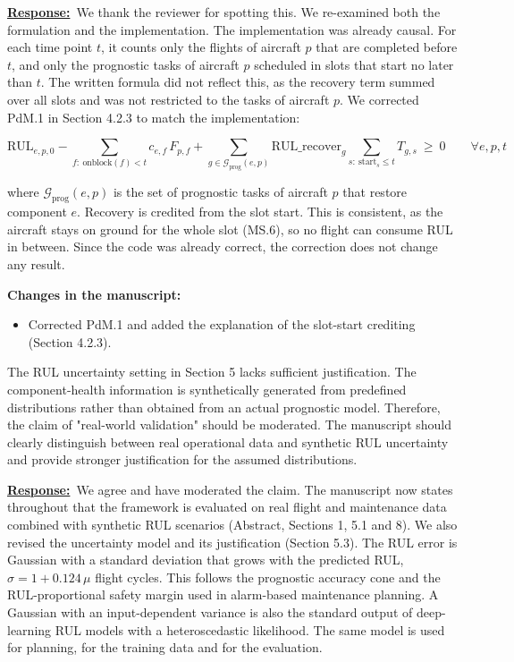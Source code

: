 \documentclass{article}
\newcommand{\response}{\vspace{0.1cm}\noindent\underline{\textbf{Response:}}\ }
\newcommand{\changes}{\vspace{0.1cm}\noindent\textbf{Changes in the manuscript:}}
\begin{document}
\response We thank the reviewer for spotting this. We re-examined both the formulation and the implementation. The implementation was already causal. For each time point $t$, it counts only the flights of aircraft $p$ that are completed before $t$, and only the prognostic tasks of aircraft $p$ scheduled in slots that start no later than $t$. The written formula did not reflect this, as the recovery term summed over all slots and was not restricted to the tasks of aircraft $p$. We corrected PdM.1 in Section 4.2.3 to match the implementation:

\[
\mathrm{RUL}_{e,p,0} - \sum_{f:\ \mathrm{onblock}(f) < t} c_{e,f}\, F_{p,f} + \sum_{g \in \mathcal{G}_{\text{prog}}(e,p)} \mathrm{RUL\_recover}_g \sum_{s:\ \mathrm{start}_s \le t} T_{g,s} \ \ge\ 0 \qquad \forall e,p,t
\]

where $\mathcal{G}_{\text{prog}}(e,p)$ is the set of prognostic tasks of aircraft $p$ that restore component $e$. Recovery is credited from the slot start. This is consistent, as the aircraft stays on ground for the whole slot (MS.6), so no flight can consume RUL in between. Since the code was already correct, the correction does not change any result.

\changes
\begin{itemize}[nosep]
\item Corrected PdM.1 and added the explanation of the slot-start crediting (Section 4.2.3).
\end{itemize}

\begin{cmt}{}{}
The RUL uncertainty setting in Section 5 lacks sufficient justification. The component-health information is synthetically generated from predefined distributions rather than obtained from an actual prognostic model. Therefore, the claim of "real-world validation" should be moderated. The manuscript should clearly distinguish between real operational data and synthetic RUL uncertainty and provide stronger justification for the assumed distributions.
\end{cmt}

\response We agree and have moderated the claim. The manuscript now states throughout that the framework is evaluated on real flight and maintenance data combined with synthetic RUL scenarios (Abstract, Sections 1, 5.1 and 8). We also revised the uncertainty model and its justification (Section 5.3). The RUL error is Gaussian with a standard deviation that grows with the predicted RUL, $\sigma = 1 + 0.124\,\mu$ flight cycles. This follows the prognostic accuracy cone and the RUL-proportional safety margin used in alarm-based maintenance planning. A Gaussian with an input-dependent variance is also the standard output of deep-learning RUL models with a heteroscedastic likelihood. The same model is used for planning, for the training data and for the evaluation.
\end{document}
